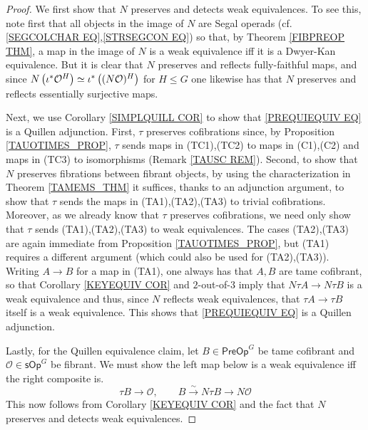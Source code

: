 \documentclass[a4paper,10pt
,draft
]{article}%
\numberwithin{equation}{section}
\numberwithin{figure}{section}
\theoremstyle{definition} %
\renewcommand{\O}{\ensuremath{\mathcal O}}
\newcommand{\1}{\ensuremath{\mathbbm 1}}%
\begin{document}
\begin{proof}
	We first show that $N$ preserves and detects weak equivalences.
	To see this, note first that all objects in the image of $N$ are Segal operads
	(cf. \eqref{SEGCOLCHAR EQ},\eqref{STRSEGCON EQ})
	 so that, by Theorem \ref{FIBPREOP THM}, 
	a map in the image of $N$ is a weak equivalence iff it is a Dwyer-Kan equivalence.
	But it is clear that $N$ preserves and reflects fully-faithful maps,
	and since
	$N \left(\iota^{\**} \O^H \right)
	\simeq
	\iota^{\**} \left( (N \O)^H \right)$
	for $H\leq G$
	one likewise has that 
	$N$ preserves and reflects essentially surjective maps.
	
	Next, we use Corollary \ref{SIMPLQUILL COR}
	to show that \eqref{PREQUIEQUIV EQ}
	is a Quillen adjunction.
	First,
	$\tau$ preserves cofibrations since,
	by Proposition \ref{TAUOTIMES_PROP},
	$\tau$ sends maps in (TC1),(TC2) to maps in (C1),(C2)
	and maps in (TC3) to isomorphisms (Remark \ref{TAUSC REM}).
	Second, to show that $N$ preserves fibrations between fibrant objects,
	by using the characterization in Theorem \ref{TAMEMS_THM}
	it suffices, thanks to an adjunction argument,
	to show that $\tau$
	sends the maps in (TA1),(TA2),(TA3)
	to trivial cofibrations. 
	Moreover, as we already know that $\tau$ preserves cofibrations, we need only show 	that $\tau$
	sends (TA1),(TA2),(TA3)
	to weak equivalences.
	The cases (TA2),(TA3) are again immediate 
	from Proposition \ref{TAUOTIMES_PROP},
	but (TA1) requires a different argument
	(which could also be used for (TA2),(TA3)).
	Writing $A \to B$ for a map in (TA1), one always has that $A,B$ are tame cofibrant, so that
	Corollary \ref{KEYEQUIV COR}
	and $2$-out-of-$3$ imply that 
	$N \tau A \to N \tau B$ is a weak equivalence
	and thus, since $N$ reflects weak equivalences,
	that $\tau A \to \tau B$ itself is a weak equivalence.
	This shows that \eqref{PREQUIEQUIV EQ}
	is a Quillen adjunction.
	
	Lastly, for the Quillen equivalence claim, 
	let $B \in \mathsf{PreOp}^G$ be tame cofibrant and
	$\mathcal{O} \in \mathsf{sOp}^G$ be fibrant.
	We must show the left map below is a weak equivalence iff 
	the right composite is.
	\[
	\tau B \to \mathcal{O},
	\qquad
	B \xrightarrow{\sim} N \tau B \to N \mathcal{O}
	\]
	This now follows from Corollary \ref{KEYEQUIV COR}
	and the fact that $N$ preserves and detects weak equivalences.
\end{proof}
\end{document}
